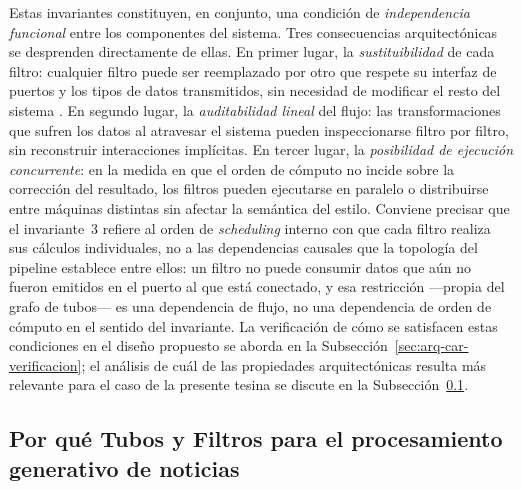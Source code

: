\documentclass[12pt]{report}
\begin{document}
Estas invariantes constituyen, en conjunto, una condición de \textit{independencia funcional} entre los componentes del sistema. Tres consecuencias arquitectónicas se desprenden directamente de ellas. En primer lugar, la \textit{sustituibilidad} de cada filtro: cualquier filtro puede ser reemplazado por otro que respete su interfaz de puertos y los tipos de datos transmitidos, sin necesidad de modificar el resto del sistema \citep{garlanshaw:1994}. En segundo lugar, la \textit{auditabilidad lineal} del flujo: las transformaciones que sufren los datos al atravesar el sistema pueden inspeccionarse filtro por filtro, sin reconstruir interacciones implícitas. En tercer lugar, la \textit{posibilidad de ejecución concurrente}: en la medida en que el orden de cómputo no incide sobre la corrección del resultado, los filtros pueden ejecutarse en paralelo o distribuirse entre máquinas distintas sin afectar la semántica del estilo. Conviene precisar que el invariante~3 refiere al orden de \textit{scheduling} interno con que cada filtro realiza sus cálculos individuales, no a las dependencias causales que la topología del pipeline establece entre ellos: un filtro no puede consumir datos que aún no fueron emitidos en el puerto al que está conectado, y esa restricción ---propia del grafo de tubos--- es una dependencia de flujo, no una dependencia de orden de cómputo en el sentido del invariante. La verificación de cómo se satisfacen estas condiciones en el diseño propuesto se aborda en la Subsección~\ref{sec:arq-car-verificacion}; el análisis de cuál de las propiedades arquitectónicas resulta más relevante para el caso de la presente tesina se discute en la Subsección~\ref{sec:arq-estilo-justificacion}.

\subsection{Por qué Tubos y Filtros para el procesamiento generativo de noticias}
\label{sec:arq-estilo-justificacion}
\end{document}
